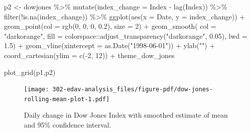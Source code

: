 \documentclass[
  letterpaper,
  DIV=11,
  numbers=noendperiod]{scrreprt}
\newenvironment{Shaded}{\begin{snugshade}}{\end{snugshade}}
\newcommand{\AttributeTok}[1]{\textcolor[rgb]{0.40,0.45,0.13}{#1}}
\newcommand{\DecValTok}[1]{\textcolor[rgb]{0.68,0.00,0.00}{#1}}
\newcommand{\FloatTok}[1]{\textcolor[rgb]{0.68,0.00,0.00}{#1}}
\newcommand{\FunctionTok}[1]{\textcolor[rgb]{0.28,0.35,0.67}{#1}}
\newcommand{\NormalTok}[1]{\textcolor[rgb]{0.00,0.23,0.31}{#1}}
\newcommand{\OtherTok}[1]{\textcolor[rgb]{0.00,0.23,0.31}{#1}}
\newcommand{\SpecialCharTok}[1]{\textcolor[rgb]{0.37,0.37,0.37}{#1}}
\newcommand{\StringTok}[1]{\textcolor[rgb]{0.13,0.47,0.30}{#1}}
\begin{document}
\begin{Shaded}
\begin{Highlighting}[]
\NormalTok{p2 }\OtherTok{\textless{}{-}}\NormalTok{ dowjones }\SpecialCharTok{\%\textgreater{}\%} 
  \FunctionTok{mutate}\NormalTok{(}\AttributeTok{index\_change =}\NormalTok{ Index }\SpecialCharTok{{-}} \FunctionTok{lag}\NormalTok{(Index)) }\SpecialCharTok{\%\textgreater{}\%} 
  \FunctionTok{filter}\NormalTok{(}\SpecialCharTok{!}\FunctionTok{is.na}\NormalTok{(index\_change)) }\SpecialCharTok{\%\textgreater{}\%} 
  \FunctionTok{ggplot}\NormalTok{(}\FunctionTok{aes}\NormalTok{(}\AttributeTok{x =}\NormalTok{ Date, }\AttributeTok{y =}\NormalTok{ index\_change)) }\SpecialCharTok{+} 
  \FunctionTok{geom\_point}\NormalTok{(}\AttributeTok{col =} \FunctionTok{rgb}\NormalTok{(}\DecValTok{0}\NormalTok{, }\DecValTok{0}\NormalTok{, }\DecValTok{0}\NormalTok{, }\FloatTok{0.2}\NormalTok{), }\AttributeTok{size =} \DecValTok{2}\NormalTok{) }\SpecialCharTok{+} 
  \FunctionTok{geom\_smooth}\NormalTok{(}
    \AttributeTok{col =} \StringTok{"darkorange"}\NormalTok{, }
    \AttributeTok{fill =}\NormalTok{ colorspace}\SpecialCharTok{::}\FunctionTok{adjust\_transparency}\NormalTok{(}\StringTok{"darkorange"}\NormalTok{, }\FloatTok{0.05}\NormalTok{),}
    \AttributeTok{lwd =} \FloatTok{1.5}\NormalTok{) }\SpecialCharTok{+}
  \FunctionTok{geom\_vline}\NormalTok{(}\AttributeTok{xintercept =} \FunctionTok{as.Date}\NormalTok{(}\StringTok{"1998{-}06{-}01"}\NormalTok{)) }\SpecialCharTok{+}
  \FunctionTok{ylab}\NormalTok{(}\StringTok{""}\NormalTok{) }\SpecialCharTok{+}
  \FunctionTok{coord\_cartesian}\NormalTok{(}\AttributeTok{ylim =} \FunctionTok{c}\NormalTok{(}\SpecialCharTok{{-}}\DecValTok{2}\NormalTok{, }\DecValTok{12}\NormalTok{)) }\SpecialCharTok{+}
\NormalTok{  theme\_dow\_jones}

\FunctionTok{plot\_grid}\NormalTok{(p1,p2)}
\end{Highlighting}
\end{Shaded}

\begin{figure}[H]

{\centering \texttt{[image: 302-edav-analysis\_files/figure-pdf/dow-jones-rolling-mean-plot-1.pdf]}

}

\caption{Daily change in Dow Jones Index with smoothed estimate of mean
and 95\% confidence interval.}

\end{figure}%
\end{document}
